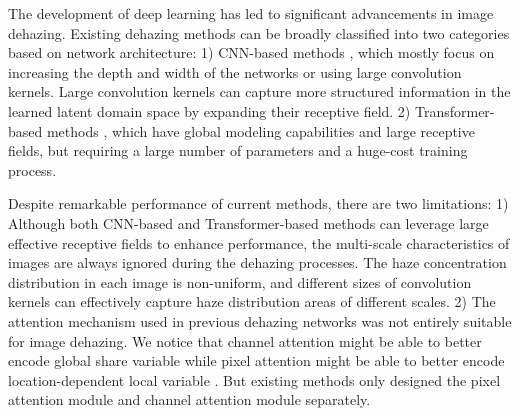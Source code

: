 \documentclass[10pt,twocolumn,letterpaper]{article}
\begin{document}
The development of deep learning has led to significant advancements in image dehazing. Existing dehazing methods can be broadly classified into two categories based on network architecture: 1) CNN-based methods \cite{GCANet,qin2020ffa,LKD-net}, which mostly focus on increasing the depth and width of the networks or using large convolution kernels. Large convolution kernels\cite{VAN,largeKernel} can capture more structured information in the learned latent domain space by expanding their receptive field. 2) Transformer-based methods \cite{Dehamer,valanarasu2022transweather,ji2021u2}, which have global modeling capabilities and large receptive fields, but requiring a large number of parameters and a huge-cost training process.

Despite remarkable performance of current methods, there are two limitations: 1) Although both CNN-based and Transformer-based methods can leverage large effective receptive fields to enhance performance, the multi-scale characteristics of images are always ignored during the dehazing processes. The haze concentration distribution in each image is non-uniform, and different sizes of convolution kernels can effectively capture haze distribution areas of different scales. 2) The attention mechanism used in previous dehazing networks\cite{qin2020ffa,AECR-net,GCANet} was not entirely suitable for image dehazing. We notice that channel attention might be able to better encode global share variable  while pixel attention might be able to better encode location-dependent local variable . But existing methods\cite{qin2020ffa,AECR-net,GCANet} only designed the pixel attention module and channel attention module separately.
\end{document}
